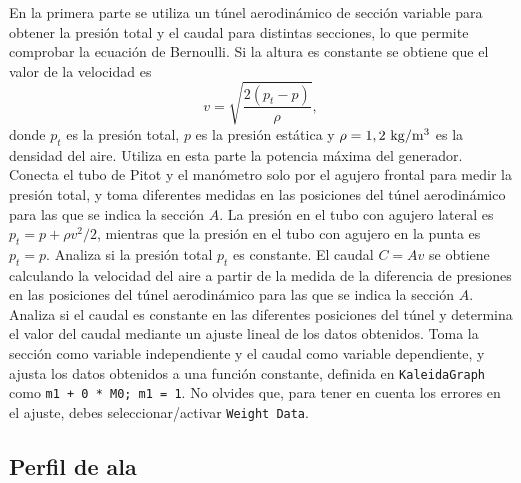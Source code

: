 \documentclass[11pt]{articulo}
\begin{document}
En la primera parte se utiliza un t\'unel aerodin\'amico de secci\'on variable para obtener la presi\'on total y el caudal para distintas secciones, lo que permite comprobar la ecuaci\'on de Bernoulli. Si la altura es constante se obtiene que el valor de la velocidad es
%
\begin{equation*}
v = \sqrt{\frac{2(p_t - p)}{\rho}},
\end{equation*}
%
donde $p_t$ es la presi\'on total,  $p$ es la presi\'on est\'atica y $\rho = 1,2~{\rm kg/m^3}$ es la densidad del aire. Utiliza en esta parte la potencia m\'axima del generador. Conecta el tubo de Pitot y el man\'ometro solo por el agujero frontal para medir la presi\'on total, y toma diferentes medidas en las posiciones del t\'unel aerodin\'amico para las que se indica la secci\'on $A$. La presi\'on en el tubo con agujero lateral es $p_t = p + \rho v^2 / 2$, mientras que la presi\'on en el tubo con agujero en la punta es $p_t = p$. Analiza si la presi\'on total $p_t$ es constante. El caudal $C = Av$ se obtiene calculando la velocidad del aire a partir de la medida de la diferencia de presiones en las posiciones del t\'unel aerodin\'amico para las que se indica la secci\'on $A$. Analiza si el caudal es constante en las diferentes posiciones del t\'unel y determina el valor del caudal mediante un ajuste lineal de los datos obtenidos. Toma la secci\'on como variable independiente y el caudal como variable dependiente, y ajusta los datos obtenidos a una funci\'on constante, definida en {\tt KaleidaGraph} como {\tt m1 + 0 * M0; m1 = 1}. No olvides que, para tener en cuenta los errores en el ajuste, debes seleccionar/activar {\tt Weight Data}.

\subsection{Perfil de ala}
\end{document}
